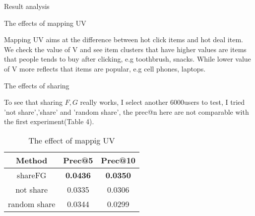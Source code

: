 \begin{section}{Result analysis}
  \begin{subsection}{The effects of mapping UV}
    \par{Mapping UV aims at the difference between hot click items and hot deal item. We check the value of V and see item clusters that have higher values are items that people tends to buy after clicking, e.g toothbrush, snacks. While lower value of V more reflects that items are popular, e.g cell phones, laptops.}
  \end{subsection}
  \begin{subsection}{The effects of sharing}
    \par{To see that sharing $F,G$ really works, I select another 6000users to test, I tried 'not share','share' and 'random share', the prec@n here are not comparable with the first experiment(Table 4).}
    \par{
\begin{table}
\begin{center}
  \begin{tabular}{|c|c|c|}
    \hline
    Method&Prec@5&Prec@10\\
    \hline
    shareFG&\textbf{\color{red}0.0436}&\textbf{\color{red}0.0350}\\
    \hline
    not share&0.0335&0.0306\\
    \hline
    random share&0.0344&0.0299\\
    \hline
  \end{tabular}
\end{center}
\caption{The effect of mappig UV}
\end{table}
}
  \end{subsection}
\end{section}

